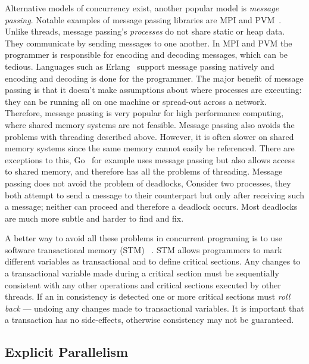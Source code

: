 Alternative models of concurrency exist,
another popular model is \emph{message passing}.
Notable examples of message passing libraries are MPI\citep{mpi} and
PVM~\citep{pvm}.
Unlike threads, message passing's \emph{processes} do not share static or heap data.
They communicate by sending messages to one another.
In MPI and PVM the programmer is responsible for encoding and decoding messages,
which can be tedious.
Languages such as Erlang~\citep{erlang} support message passing natively and
encoding and decoding is done for the programmer.
The major benefit of message passing is that it doesn't make assumptions about where processes
are executing:
they can be running all on one machine or spread-out across a network.
Therefore, message passing is very popular for high performance computing,
where shared memory systems are not feasible.
Message passing also avoids the problems with threading described above.
However,
it is often slower on shared memory systems since the same memory cannot easily
be referenced.
There are exceptions to this,
Go~\citep{balbaert:2012:go} for example uses message passing but also allows
access to shared memory,
and therefore has all the problems of threading.
Message passing does not avoid the problem of deadlocks,
Consider two processes,
they both attempt to send a message to their counterpart but only after
receiving such a message;
neither can proceed and therefore a deadlock occurs.
Most deadlocks are much more subtle and harder to find and fix.

A better way to avoid all these problems in concurrent programing is to use
software transactional memory (STM)~%
\citep{harris:2005:haskell-stm,mika:mercury-stm}.
STM allows programmers to mark different variables as transactional
and to define critical sections.
Any changes to a transactional variable made during a critical section must
be sequentially consistent with any other operations and critical
sections executed by other threads.
If an in consistency is detected one or more critical sections must
\emph{roll back} --- undoing any changes made to transactional
variables.
It is important that a transaction has no side-effects, otherwise
consistency may not be guaranteed.


\subsection{Explicit Parallelism}
\label{sec:back_par_explicit}

